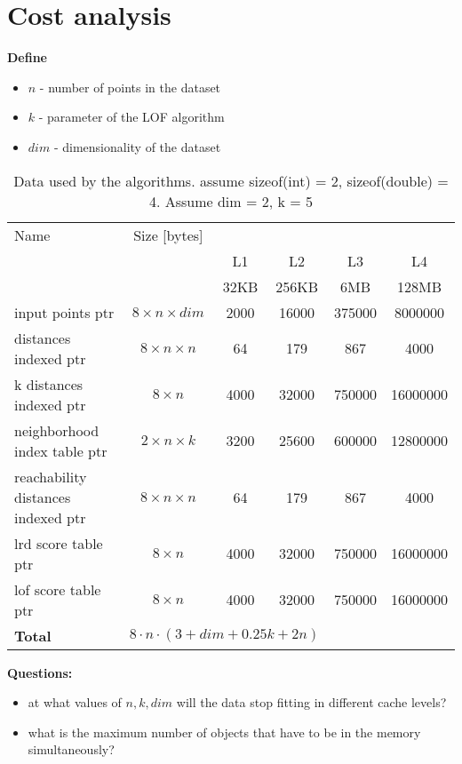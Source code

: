 \documentclass[12pt,a4paper,oneside]{article}
\begin{document}
	\section*{Cost analysis}
	
	\textbf{Define}
	\begin{itemize}
		\item $n$ - number of points in the dataset
		\item $k$ - parameter of the LOF algorithm
		\item $dim$ - dimensionality of the dataset
	\end{itemize}
	
	\begin{table}[h!]
		\centering
	\begin{tabular}{l|c|cccc}
		\toprule
		Name & Size [bytes] &&&& \\
		&  &L1 & L2 & L3& L4 \\
		&  &32KB & 256KB & 6MB& 128MB\\
		\midrule
		input points ptr &  $8\times n \times dim$  & 2000 & 16000&375000& 8000000\\
		distances indexed ptr  & $8\times n \times n$  &64&179&867 & 4000\\
		k distances indexed ptr  & $8\times n$ &4000&32000&750000&16000000\\
		neighborhood index table ptr  & $2\times n \times k$  &3200&25600&600000&12800000\\
		reachability distances indexed ptr  &  $8\times n \times n$  &64&179&867 & 4000\\
		lrd score table ptr  & $8\times n$ &4000&32000&750000&16000000\\
		lof score table ptr  & $8\times n$ &4000&32000&750000&16000000\\
		\bottomrule
		\textbf{Total}  & \multicolumn{3}{c}{$8\cdot n\cdot ( 3 + dim + 0.25k + 2 n  )$} &&\\
		\bottomrule
	\end{tabular}
	\caption{Data used by the algorithms. \newline 
		assume sizeof(int) = 2, sizeof(double) = 4. Assume dim = 2,  k = 5}
	\end{table}
	
	\textbf{Questions:}
	
	\begin{itemize}
		\item  at what values of $n, k, dim$ will the data stop fitting in different cache levels?
		\item what is the maximum number of objects that have to be in the memory simultaneously?
	\end{itemize}
	
\end{document}
